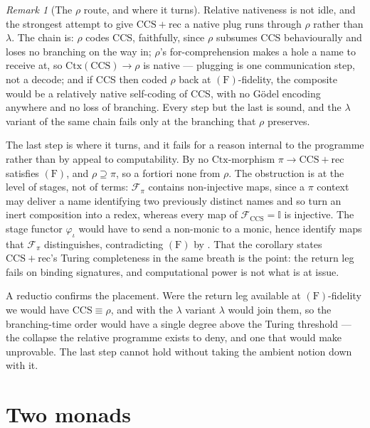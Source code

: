 \documentclass[11pt,a4paper]{article}
\theoremstyle{definition}
\theoremstyle{plain}
\theoremstyle{remark}
\newtheorem{remark}[definition]{Remark}
\newcommand{\CtxC}{\mathrm{Ctx}}
\newcommand{\rhoc}{\rho}
\newcommand{\CCSrec}{\mathrm{CCS}{+}\mathrm{rec}}
\newcommand{\Fcond}{(\mathrm{F})}
\begin{document}
\begin{remark}[The $\rhoc$ route, and where it turns]
\label{rmk:rho-route}
Relative nativeness is not idle, and the strongest attempt to give $\CCSrec$ a native plug runs
through $\rhoc$ rather than $\lambda$. The chain is: $\rhoc$ codes CCS, faithfully, since $\rhoc$
subsumes CCS behaviourally and loses no branching on the way in; $\rhoc$'s for-comprehension makes a
hole a name to receive at, so $\CtxC(\mathrm{CCS}) \to \rhoc$ is native --- plugging is one
communication step, not a decode; and if CCS then coded $\rhoc$ back at $\Fcond$-fidelity, the
composite would be a relatively native self-coding of CCS, with no Gödel encoding anywhere and no
loss of branching. Every step but the last is sound, and the $\lambda$ variant of the same chain
fails only at the branching that $\rhoc$ preserves.

The last step is where it turns, and it fails for a reason internal to the programme rather than by
appeal to computability. By \cite[Cor.~5.10]{probe} no $\CtxC$-morphism $\pi \to \CCSrec$ satisfies
$\Fcond$, and $\rhoc \supseteq \pi$, so a fortiori none from $\rhoc$. The obstruction is at the level
of stages, not of terms: $\mathcal{F}_\pi$ contains non-injective maps, since a $\pi$ context may
deliver a name identifying two previously distinct names and so turn an inert composition into a
redex, whereas every map of $\mathcal{F}_{\mathrm{CCS}} = \mathbb{I}$ is injective. The stage functor
$\varphi_\iota$ would have to send a non-monic to a monic, hence identify maps that $\mathcal{F}_\pi$
distinguishes, contradicting $\Fcond$ by \cite[Prop.~5.9]{probe}. That the corollary states
$\CCSrec$'s Turing completeness in the same breath is the point: the return leg fails on binding
signatures, and computational power is not what is at issue.

A reductio confirms the placement. Were the return leg available at $\Fcond$-fidelity we would have
$\mathrm{CCS} \equiv \rhoc$, and with the $\lambda$ variant $\lambda$ would join them, so the
branching-time order would have a single degree above the Turing threshold --- the collapse the
relative programme exists to deny, and one that would make \cite[Problem~4]{probe} unprovable. The
last step cannot hold without taking the ambient notion down with it.
\end{remark}

\section{Two monads}
\label{sec:monads}
\end{document}

